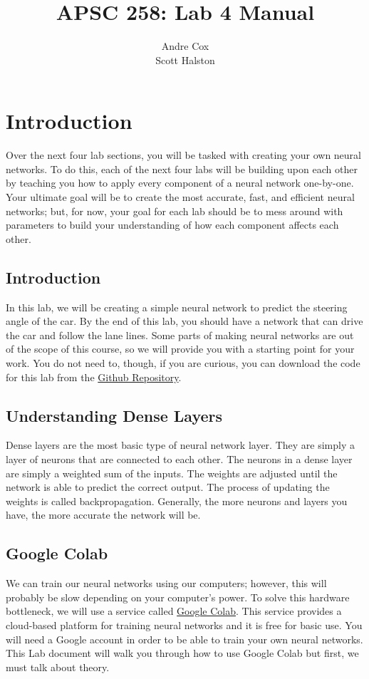 \documentclass[11pt]{report}
\title{APSC 258: Lab 4 Manual}
\author{Andre Cox \\ Scott Halston}
\begin{document}
\maketitle
\tableofcontents

\clearpage

\chapter{Introduction}
Over the next four lab sections, you will be tasked with creating your own neural networks. To do this, each of the next four labs will be building upon each other by teaching you how to apply every component of a neural network one-by-one. Your ultimate goal will be to create the most accurate, fast, and efficient neural networks; but, for now, your goal for each lab should be to mess around with parameters to build your understanding of how each component affects each other.

\section{Introduction}
In this lab, we will be creating a simple neural network to predict the steering angle of the car.
By the end of this lab, you should have a network that can drive the car and follow the lane lines. Some parts of making neural networks are out of the scope of this course, so we will provide you with a starting point for your work. You do not need to, though, if you are curious, you can download the code for this lab from the
\href{https://github.com/PiCarV/Demos}{Github Repository}.

\section{Understanding Dense Layers}
Dense layers are the most basic type of neural network layer. They are simply a layer of neurons that are connected to each other. The neurons in a dense layer are simply a weighted sum of the inputs. The weights are adjusted until the network is able to predict the correct output. The process of updating the weights is called backpropagation. Generally, the more neurons and layers you have, the more accurate the network will be. 

\section{Google Colab} 
We can train our neural networks using our computers; however, this will probably be slow depending on your computer's power. To solve this hardware bottleneck, we will use a service called \href{https://colab.research.google.com/}{Google Colab}. This service provides a cloud-based platform for training neural networks and it is free for basic use. You will need a Google account in order to be able to train your own neural networks. This Lab document will walk you through how to use Google Colab but first, we must talk about theory.
\end{document}
